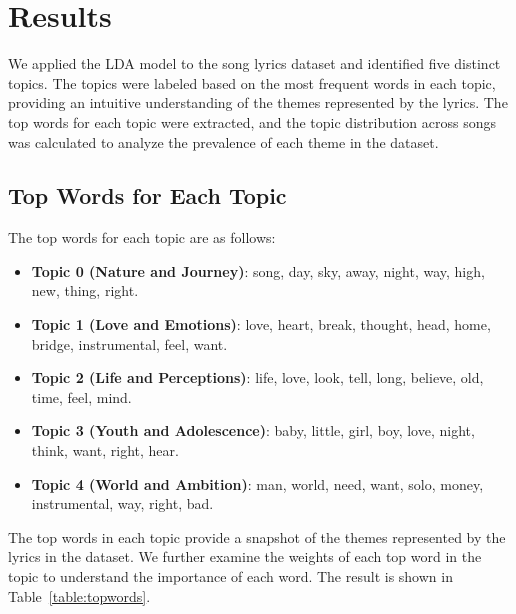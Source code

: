 \documentclass{article}
\begin{document}
\section{Results}

We applied the LDA model to the song lyrics dataset and identified five distinct topics. The topics were labeled based on the most frequent words in each topic, providing an intuitive understanding of the themes represented by the lyrics. The top words for each topic were extracted, and the topic distribution across songs was calculated to analyze the prevalence of each theme in the dataset.

\subsection{Top Words for Each Topic}

The top words for each topic are as follows:

\begin{itemize}
    \item \textbf{Topic 0 (Nature and Journey)}: song, day, sky, away, night, way, high, new, thing, right.
    \item \textbf{Topic 1 (Love and Emotions)}: love, heart, break, thought, head, home, bridge, instrumental, feel, want.
    \item \textbf{Topic 2 (Life and Perceptions)}: life, love, look, tell, long, believe, old, time, feel, mind.
    \item \textbf{Topic 3 (Youth and Adolescence)}: baby, little, girl, boy, love, night, think, want, right, hear.
    \item \textbf{Topic 4 (World and Ambition)}: man, world, need, want, solo, money, instrumental, way, right, bad.
\end{itemize}

\noindent The top words in each topic provide a snapshot of the themes represented by the lyrics in the dataset. We further examine the weights of each top word in the topic to understand the importance of each word. The result is shown in Table~\ref{table:topwords}.
\end{document}
